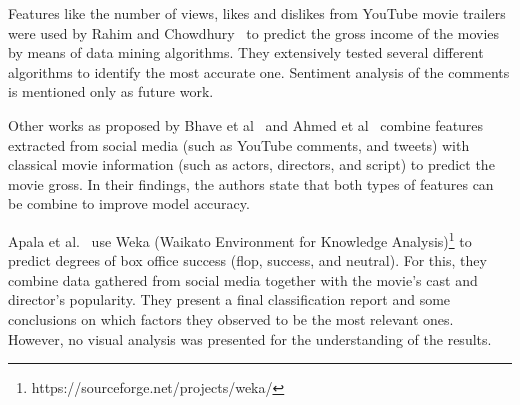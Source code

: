 Features like the number of views, likes and dislikes from YouTube movie trailers were used by Rahim and Chowdhury~\cite{2017MiningYouTubeTrailers} to predict the gross income of the movies by means of data mining algorithms. They extensively tested several different algorithms to identify the most accurate one. Sentiment analysis of the comments is mentioned only as future work. 



Other works as proposed by Bhave et al~\cite{2015Crowd-Source} and Ahmed et al~\cite{2015DifferentFactors} combine features extracted from social media (such as YouTube comments, and tweets) with classical movie information (such as actors, directors, and script) to predict the movie gross. In their findings, the authors state that both types of features can be combine to improve model accuracy.



Apala et al.~\cite{2013weka} use Weka (Waikato Environment for Knowledge Analysis)\footnote{https://sourceforge.net/projects/weka/} to predict degrees of box office success (flop, success, and neutral). For this, they combine data gathered from social media together with the movie's cast and director's popularity. They present a final classification report and some conclusions on which factors they observed to be the most relevant ones. However, no visual analysis was presented for the understanding of the results.


